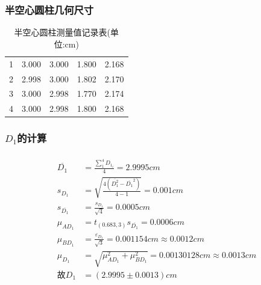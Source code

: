 \documentclass[12pt,a4paper,UTF8]{ctexart}
\begin{document}
\subsubsection*{半空心圆柱几何尺寸}
\begin{table}[!htbp]
	\centering
	\caption{半空心圆柱测量值记录表(单位:cm)}
	\begin{tabular}{ccccc}
		\toprule
		\makebox[0.1\textwidth][c]{次数}&\makebox[0.1\textwidth][c]{$D_{1_i}$}&\makebox[0.1\textwidth][c]{$H_{1_i}$}&\makebox[0.1\textwidth][c]{$D_{2_i}$}&\makebox[0.1\textwidth][c]{$H_{2_i}$}\\
		\midrule
		1 & 3.000 & 3.000  	& 1.800	& 2.168\\
		2 & 2.998 & 3.000 	& 1.802	& 2.170\\
		3 & 3.000 & 2.998   & 1.770	& 2.174\\
		4 & 3.000 & 2.998   & 1.800 & 2.168\\	
		\bottomrule
	\end{tabular}
\end{table}
\subsubsection*{$D_1$的计算}
\begin{align*}
	\begin{aligned}
	\overline{D_1}&=\frac{\sum_{1}^{4}D_{1_i}}{4}=2.9995cm\\
	s_{D_{1}}&=\sqrt{\frac{4(\overline{D_1^2}-\overline{D_1}^2)}{4-1}}=0.001cm\\
	s_{\overline{D_1}} &= \frac{s_{D_{1}}}{\sqrt{4}} = 0.0005cm\\
	\mu_{AD_1} &= t_{(0.683,3)}s_{\overline{D_1}} = 0.0006cm\\
	\mu_{BD_1} &= \frac{\varepsilon_{D_1}}{\sqrt{3}} = 0.001154cm\approx 0.0012cm\\
	\mu_{D_1} &= \sqrt{\mu_{AD_1}^2+\mu_{BD_1}^2}=0.00130128cm\approx 0.0013cm\\
	\text{故}D_1 &= (2.9995 \pm 0.0013)cm \\
	\end{aligned}
\end{align*}
\end{document}
